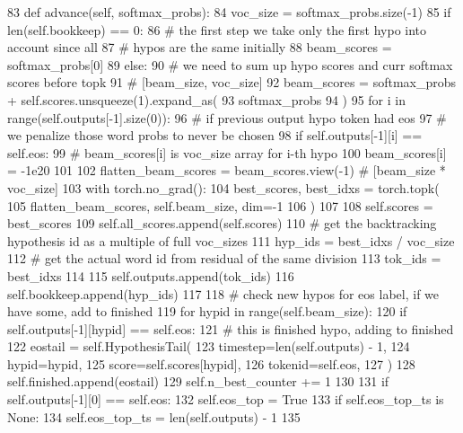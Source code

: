 \begin{DoxyCode}
83     \textcolor{keyword}{def }advance(self, softmax\_probs):
84         voc\_size = softmax\_probs.size(-1)
85         \textcolor{keywordflow}{if} len(self.bookkeep) == 0:
86             \textcolor{comment}{# the first step we take only the first hypo into account since all}
87             \textcolor{comment}{# hypos are the same initially}
88             beam\_scores = softmax\_probs[0]
89         \textcolor{keywordflow}{else}:
90             \textcolor{comment}{# we need to sum up hypo scores and curr softmax scores before topk}
91             \textcolor{comment}{# [beam\_size, voc\_size]}
92             beam\_scores = softmax\_probs + self.scores.unsqueeze(1).expand\_as(
93                 softmax\_probs
94             )
95             \textcolor{keywordflow}{for} i \textcolor{keywordflow}{in} range(self.outputs[-1].size(0)):
96                 \textcolor{comment}{#  if previous output hypo token had eos}
97                 \textcolor{comment}{# we penalize those word probs to never be chosen}
98                 \textcolor{keywordflow}{if} self.outputs[-1][i] == self.eos:
99                     \textcolor{comment}{# beam\_scores[i] is voc\_size array for i-th hypo}
100                     beam\_scores[i] = -1e20
101 
102         flatten\_beam\_scores = beam\_scores.view(-1)  \textcolor{comment}{# [beam\_size * voc\_size]}
103         with torch.no\_grad():
104             best\_scores, best\_idxs = torch.topk(
105                 flatten\_beam\_scores, self.beam\_size, dim=-1
106             )
107 
108         self.scores = best\_scores
109         self.all\_scores.append(self.scores)
110         \textcolor{comment}{# get the backtracking hypothesis id as a multiple of full voc\_sizes}
111         hyp\_ids = best\_idxs / voc\_size
112         \textcolor{comment}{# get the actual word id from residual of the same division}
113         tok\_ids = best\_idxs %
114 
115         self.outputs.append(tok\_ids)
116         self.bookkeep.append(hyp\_ids)
117 
118         \textcolor{comment}{#  check new hypos for eos label, if we have some, add to finished}
119         \textcolor{keywordflow}{for} hypid \textcolor{keywordflow}{in} range(self.beam\_size):
120             \textcolor{keywordflow}{if} self.outputs[-1][hypid] == self.eos:
121                 \textcolor{comment}{#  this is finished hypo, adding to finished}
122                 eostail = self.HypothesisTail(
123                     timestep=len(self.outputs) - 1,
124                     hypid=hypid,
125                     score=self.scores[hypid],
126                     tokenid=self.eos,
127                 )
128                 self.finished.append(eostail)
129                 self.n\_best\_counter += 1
130 
131         \textcolor{keywordflow}{if} self.outputs[-1][0] == self.eos:
132             self.eos\_top = \textcolor{keyword}{True}
133             \textcolor{keywordflow}{if} self.eos\_top\_ts \textcolor{keywordflow}{is} \textcolor{keywordtype}{None}:
134                 self.eos\_top\_ts = len(self.outputs) - 1
135 
\end{DoxyCode}
